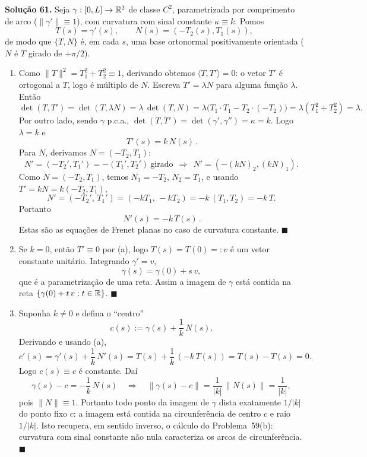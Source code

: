 \bigskip\noindent\textbf{Solução 61.}\quad
Seja $\gamma:[0,L]\to\mathbb{R}^2$ de classe $C^2$, parametrizada por comprimento de arco ($\|\gamma'\|\equiv1$), com curvatura com sinal constante $\kappa\equiv k$. Pomos
\[
T(s)=\gamma'(s),\qquad N(s)=(-T_2(s),T_1(s)),
\]
de modo que $\{T,N\}$ é, em cada $s$, uma base ortonormal positivamente orientada ($N$ é $T$ girado de $+\pi/2$).

\begin{enumerate}[label=(\alph*)]

\item Como $\|T\|^2=T_1^2+T_2^2\equiv1$, derivando obtemos $\langle T,T'\rangle=0$: o vetor $T'$ é ortogonal a $T$, logo é múltiplo de $N$. Escreva $T'=\lambda N$ para alguma função $\lambda$. Então
\[
\det(T,T')=\det(T,\lambda N)=\lambda\,\det(T,N)=\lambda\big(T_1\cdot T_1-T_2\cdot(-T_2)\big)=\lambda(T_1^2+T_2^2)=\lambda.
\]
Por outro lado, sendo $\gamma$ p.c.a., $\det(T,T')=\det(\gamma',\gamma'')=\kappa=k$. Logo $\lambda=k$ e
\[
\boxed{\,T'(s)=k\,N(s)\,}.
\]
Para $N$, derivamos $N=(-T_2,T_1)$:
\[
N'=(-T_2',T_1')=-(T_1',T_2')\ \text{girado}\ \ \Longrightarrow\ \
N'=(-(kN)_2,(kN)_1).
\]
Como $N=(-T_2,T_1)$, temos $N_1=-T_2$, $N_2=T_1$, e usando $T'=kN=k(-T_2,T_1)$,
\[
N'=(-T_2',\,T_1')=(-kT_1,\,-kT_2)=-k\,(T_1,T_2)=-k\,T.
\]
Portanto
\[
\boxed{\,N'(s)=-k\,T(s)\,}.
\]
Estas são as equações de Frenet planas no caso de curvatura constante. \qquad$\blacksquare$

\item Se $k=0$, então $T'\equiv0$ por (a), logo $T(s)=T(0)=:v$ é um vetor constante unitário. Integrando $\gamma'=v$,
\[
\gamma(s)=\gamma(0)+s\,v,
\]
que é a parametrização de uma reta. Assim a imagem de $\gamma$ está contida na reta $\{\gamma(0)+t\,v:t\in\mathbb{R}\}$. \qquad$\blacksquare$

\item Suponha $k\neq0$ e defina o ``centro''
\[
c(s):=\gamma(s)+\frac1k\,N(s).
\]
Derivando e usando (a),
\[
c'(s)=\gamma'(s)+\frac1k\,N'(s)=T(s)+\frac1k\,(-k\,T(s))=T(s)-T(s)=0.
\]
Logo $c(s)\equiv c$ é constante. Daí
\[
\gamma(s)-c=-\frac1k\,N(s)\quad\Longrightarrow\quad
\|\gamma(s)-c\|=\frac1{|k|}\,\|N(s)\|=\frac1{|k|},
\]
pois $\|N\|\equiv1$. Portanto todo ponto da imagem de $\gamma$ dista exatamente $1/|k|$ do ponto fixo $c$: a imagem está contida na circunferência de centro $c$ e raio $1/|k|$. Isto recupera, em sentido inverso, o cálculo do Problema~59(b): curvatura com sinal constante não nula caracteriza os arcos de circunferência. \qquad$\blacksquare$

\end{enumerate}


